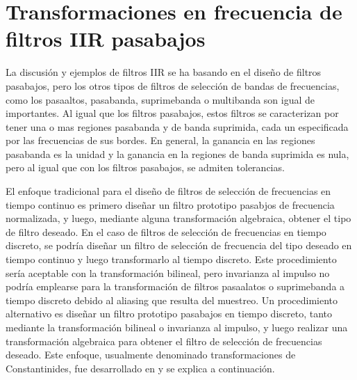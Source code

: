 \documentclass[a4paper]{report}
\begin{document}
\section{Transformaciones en frecuencia de filtros IIR pasabajos}

La discusión y ejemplos de filtros IIR se ha basando en el diseño de filtros pasabajos, pero los otros tipos de filtros de selección de bandas de frecuencias, como los pasaaltos, pasabanda, suprimebanda o multibanda son igual de importantes. Al igual que los filtros pasabajos, estos filtros se caracterizan por tener una o mas regiones pasabanda y de banda suprimida, cada un especificada por las frecuencias de sus bordes. En general, la ganancia en las regiones pasabanda es la unidad y la ganancia en la regiones de banda suprimida es nula, pero al igual que con los filtros pasabajos, se admiten tolerancias.

El enfoque tradicional para el diseño de filtros de selección de frecuencias en tiempo continuo es primero diseñar un filtro prototipo pasabjos de frecuencia normalizada, y luego, mediante alguna transformación algebraica, obtener el tipo de filtro deseado. En el caso de filtros de selección de frecuencias en tiempo discreto, se podría diseñar un filtro de selección de frecuencia del tipo deseado en tiempo continuo y luego transformarlo al tiempo discreto. Este procedimiento sería aceptable con la transformación bilineal, pero invarianza al impulso no podría emplearse para la transformación de filtros pasaalatos o suprimebanda a tiempo discreto debido al aliasing que resulta del muestreo. Un procedimiento alternativo es diseñar un filtro prototipo pasabajos en tiempo discreto, tanto mediante la transformación bilineal o invarianza al impulso, y luego realizar una transformación algebraica para obtener el filtro de selección de frecuencias deseado. Este enfoque, usualmente denominado transformaciones de Constantinides, fue desarrollado en \cite{constantinides1970spectral} y se explica a continuación.
\end{document}
